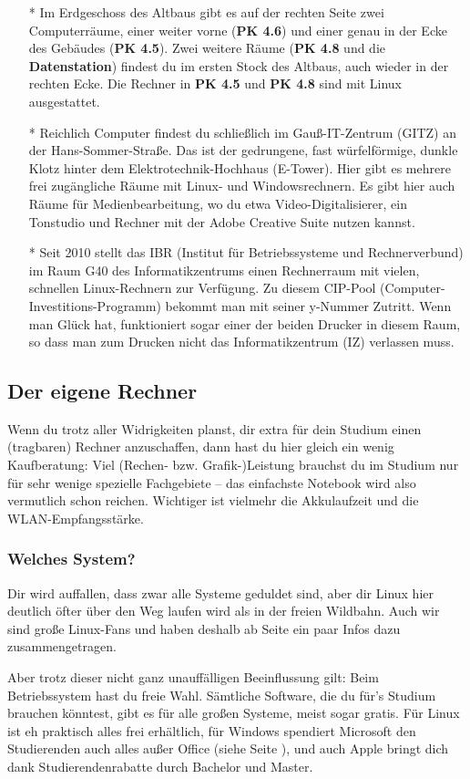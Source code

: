 			\begin{itemize}
				\item[*] Im Erdgeschoss des Altbaus gibt es auf der rechten Seite zwei Computerräume, einer weiter vorne (\textbf{PK 4.6}) und einer genau in der Ecke des Gebäudes (\textbf{PK 4.5}). Zwei weitere Räume (\textbf{PK 4.8} und die \textbf{Datenstation}) findest du im ersten Stock des Altbaus, auch wieder in der rechten Ecke. Die Rechner in \textbf{PK 4.5} und \textbf{PK 4.8} sind mit Linux ausgestattet.

				\item[*] Reichlich Computer findest du schließlich im Gauß-IT-Zentrum (GITZ) an der Hans-Sommer-Straße. Das ist der gedrungene, fast würfelförmige, dunkle Klotz hinter dem Elektrotechnik-Hochhaus (E-Tower). Hier gibt es mehrere frei zugängliche Räume mit Linux- und Windowsrechnern. Es gibt hier auch Räume für Medienbearbeitung, wo du etwa Video-Digitalisierer, ein Tonstudio und Rechner mit der Adobe Creative Suite nutzen kannst.

				\item[*] Seit 2010 stellt das IBR (Institut für Betriebssysteme und Rechnerverbund) im Raum G40 des Informatikzentrums einen Rechnerraum mit vielen, schnellen Linux-Rechnern  zur Verfügung. Zu diesem CIP-Pool (Computer-Investitions-Programm) bekommt man mit seiner y-Nummer Zutritt. Wenn man Glück hat, funktioniert sogar einer der beiden Drucker in diesem Raum, so dass man zum Drucken nicht das Informatikzentrum (IZ) verlassen muss.
			\end{itemize}

		\subsection{Der eigene Rechner}
			Wenn du trotz aller Widrigkeiten planst, dir extra für dein Studium einen (tragbaren) Rechner anzuschaffen, dann hast du hier gleich ein wenig Kaufberatung: Viel (Rechen- bzw. Grafik-)Leistung brauchst du im Studium  nur für sehr wenige spezielle Fachgebiete -- das einfachste Notebook wird also vermutlich schon reichen. Wichtiger ist vielmehr die Akkulaufzeit und die WLAN-Empfangsstärke.

		\subsubsection{Welches System?}
			Dir wird auffallen, dass zwar alle Systeme geduldet sind, aber dir Linux hier deutlich öfter über den Weg laufen wird als in der freien Wildbahn. Auch wir sind große Linux-Fans und haben deshalb ab Seite \pageref{linux} ein paar Infos dazu zusammengetragen.

			Aber trotz dieser nicht ganz unauffälligen Beeinflussung gilt: Beim Betriebssystem hast du freie Wahl. Sämtliche Software, die du für's Studium brauchen  könntest, gibt es für alle großen Systeme, meist sogar gratis. Für Linux ist eh  praktisch alles frei erhältlich, für Windows spendiert Microsoft den Studierenden auch alles außer Office (siehe Seite \pageref{msdnaa}), und auch Apple bringt dich dank Studierendenrabatte durch Bachelor und Master.
